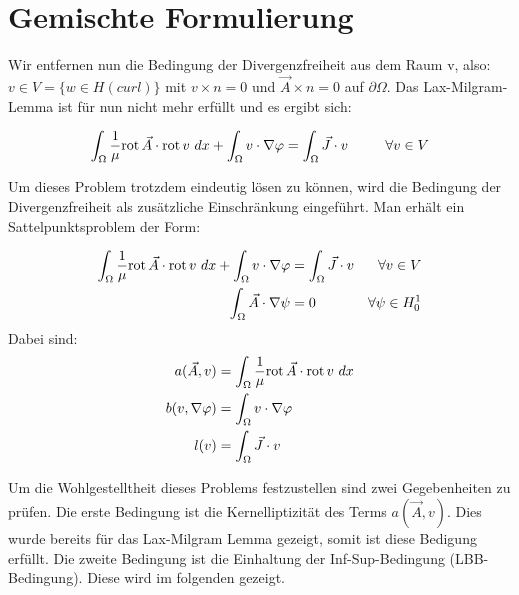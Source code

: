 \section{Gemischte Formulierung}
Wir entfernen nun die Bedingung der Divergenzfreiheit aus dem Raum v, also: $v\in V = \{w \in H(curl)\}$ mit $v\times n = 0$ und $\vec{A}\times n = 0$ auf $\partial\Omega$. Das Lax-Milgram-Lemma ist f\"ur nun nicht mehr erf\"ullt und es ergibt sich: 
\par
\begin{equation}
	\int_\Omega \frac{1}{\mu}\mathrm{rot}\, \vec{A} \cdot \mathrm{rot}\, v ~dx + \int_\Omega v\cdot\nabla\varphi = \int_\Omega \vec{J}\cdot v ~~~~~~~~\forall v \in V
\end{equation}

\newpage 

Um dieses Problem trotzdem eindeutig l\"osen zu k\"onnen, wird die Bedingung der Divergenzfreiheit als zus\"atzliche Einschr\"ankung eingef\"uhrt. Man erh\"alt ein Sattelpunktsproblem der Form:
\par
\begin{align}
	\int_\Omega \frac{1}{\mu}\mathrm{rot}\, \vec{A} \cdot \mathrm{rot}\, v ~dx + \int_\Omega v\cdot\nabla\varphi & = \int_\Omega \vec{J}\cdot v &\forall v \in V \\
	\int_\Omega \vec{A}\cdot \nabla\psi &= 0 &\forall\psi\in H^1_0
\end{align}
Dabei sind:
\begin{align}
	a(\vec{A},v) &= \int_\Omega \frac{1}{\mu}\mathrm{rot}\, \vec{A} \cdot \mathrm{rot}\, v ~dx \\
	b(v,\nabla\varphi) &=  \int_\Omega v\cdot\nabla\varphi \\
	l(v) &= \int_\Omega \vec{J}\cdot v 
\end{align}

\par
Um die Wohlgestelltheit dieses Problems festzustellen sind zwei Gegebenheiten zu pr\"ufen. Die erste Bedingung ist die Kernelliptizit\"at des Terms $a(\vec{A},v)$. Dies wurde bereits f\"ur das Lax-Milgram Lemma gezeigt, somit ist diese Bedigung erf\"ullt. Die zweite Bedingung ist die Einhaltung der Inf-Sup-Bedingung (LBB-Bedingung). Diese wird im folgenden gezeigt.


